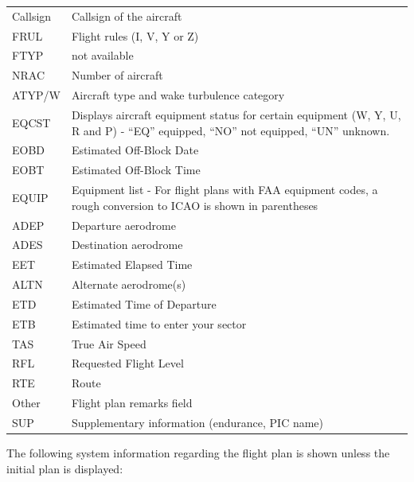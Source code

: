 \documentclass[a4paper,oneside,11pt]{memoir}
\begin{document}
\begin{longtable}{p{2.5cm} p{10cm}}
    Callsign    & Callsign of the aircraft\\
    FRUL        & Flight rules (I, V, Y or Z)\\
    FTYP        & not available\\
    NRAC        & Number of aircraft\\
    ATYP/W      & Aircraft type and wake turbulence category\\
    EQCST       & Displays aircraft equipment status for certain equipment (W, Y, U, R and P) - “EQ” equipped, “NO” not equipped, “UN” unknown.\\
    EOBD        & Estimated Off-Block Date\\
    EOBT        & Estimated Off-Block Time\\
    EQUIP       & Equipment list - For flight plans with FAA equipment codes, a rough conversion to ICAO is shown in parentheses\\
    ADEP        & Departure aerodrome\\
    ADES        & Destination aerodrome\\
    EET         & Estimated Elapsed Time\\
    ALTN        & Alternate aerodrome(s)\\
    ETD         & Estimated Time of Departure\\
    ETB         & Estimated time to enter your sector\\
    TAS         & True Air Speed\\
    RFL         & Requested Flight Level\\
    RTE         & Route\\
    Other       & Flight plan remarks field\\
    SUP         & Supplementary information (endurance, PIC name)\\
\end{longtable}

\bigskip

The following system information regarding the flight plan is shown unless the initial plan is displayed:

\bigskip
\end{document}
